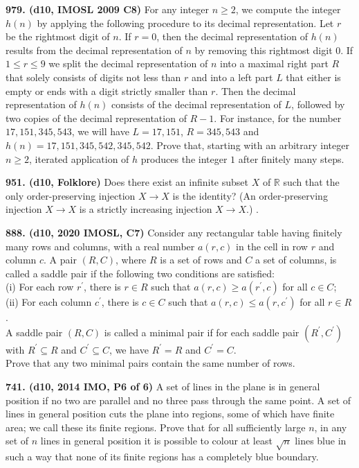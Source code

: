 \documentclass{article}
\begin{document}
\textbf{979. (\color{red}d10\color{black}, IMOSL 2009 C8)} For any integer $n\geq 2$, we compute the integer $h(n)$ by applying the following procedure to its decimal representation. Let $r$ be the rightmost digit of $n$.
If $r=0$, then the decimal representation of $h(n)$ results from the decimal representation of $n$ by removing this rightmost digit $0$.
If $1\leq r \leq 9$ we split the decimal representation of $n$ into a maximal right part $R$ that solely consists of digits not less than $r$ and into a left part $L$ that either is empty or ends with a digit strictly smaller than $r$. Then the decimal representation of $h(n)$ consists of the decimal representation of $L$, followed by two copies of the decimal representation of $R-1$. For instance, for the number $17,151,345,543$, we will have $L=17,151$, $R=345,543$ and $h(n)=17,151,345,542,345,542$.
Prove that, starting with an arbitrary integer $n\geq 2$, iterated application of $h$ produces the integer $1$ after finitely many steps.

\textbf{951. (\color{red}d10\color{black}, Folklore)} Does there exist an infinite subset $X$ of $\mathbb{R}$ such that the only order-preserving injection $X \to X$ is the identity? (An order-preserving injection $X \to X$ is a strictly increasing injection $X \to X$.) .

\textbf{888. (\color{red}d10\color{black}, 2020 IMOSL, C7)} Consider any rectangular table having finitely many rows and columns, with a real number $a(r, c)$ in the cell in row $r$ and column $c$. A pair $(R, C)$, where $R$ is a set of rows and $C$ a set of columns, is called a saddle pair if the following two conditions are satisfied:\\
(i) For each row $r^{\prime}$, there is $r \in R$ such that $a(r, c) \geq a\left(r^{\prime}, c\right)$ for all $c \in C$;\\
(ii) For each column $c^{\prime}$, there is $c \in C$ such that $a(r, c) \leq a\left(r, c^{\prime}\right)$ for all $r \in R$. \\

A saddle pair $(R, C)$ is called a minimal pair if for each saddle pair $\left(R^{\prime}, C^{\prime}\right)$ with $R^{\prime} \subseteq R$ and $C^{\prime} \subseteq C$, we have $R^{\prime}=R$ and $C^{\prime}=C$.\\
Prove that any two minimal pairs contain the same number of rows.

\textbf{741. (\color{red}d10\color{black}, 2014 IMO, P6 of 6)} A set of lines in the plane is in general position if no two are parallel and no three pass through the same point. A set of lines in general position cuts the plane into regions, some of which have finite area; we call these its finite regions. Prove that for all sufficiently large $n$, in any set of $n$ lines in general position it is possible to colour at least $\sqrt{n}$ lines blue in such a way that none of its finite regions has a completely blue boundary.
\end{document}
